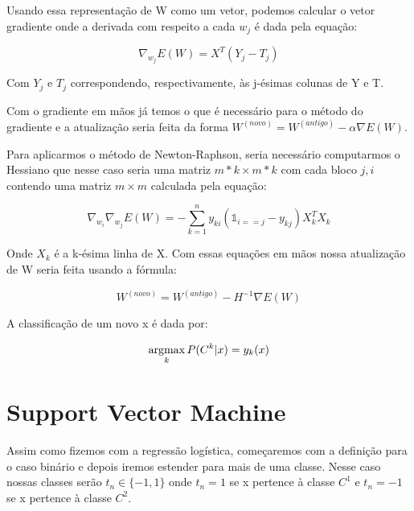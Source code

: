 Usando essa representação de W como um vetor, podemos calcular o vetor gradiente onde a derivada
com respeito a cada $w_j$ é dada pela equação:

\begin{center}
	\begin{equation}
		\nabla_{w_j} E(W) = X^T(Y_j - T_j)
	\end{equation}
\end{center}

Com $Y_j$ e $T_j$ correspondendo, respectivamente, às j-ésimas colunas de Y e T.

Com o gradiente em mãos já temos o que é necessário para o método do gradiente e a
atualização seria feita da forma $W^{ (novo) } = W^{ (antigo) } - \alpha \nabla E(W)$.

Para aplicarmos o método de Newton-Raphson, seria necessário computarmos o Hessiano que
nesse caso seria uma matriz $m*k \times m*k$ com cada bloco $j, i$ contendo uma matriz
$m \times m$ calculada pela equação:

\begin{center}
	\begin{equation}
		\nabla_{w_i} \nabla_{w_j} E(W) = - \sum_{k = 1}^n y_{ki}( \mathds{1}_{i == j} - y_{kj})
		X_k^TX_k
	\end{equation}
\end{center} 

Onde $X_k$ é a k-ésima linha de X. Com essas equações em mãos nossa atualização de
W seria feita usando a fórmula:

\begin{center}
	\begin{equation}
		 W^{ (novo) } = W^{ (antigo) } - H^{-1}\nabla E(W)	
	\end{equation}
\end{center}

A classificação de um novo x é dada por: 

\begin{center}
	\begin{equation}	
		\operatorname*{argmax}_{k} P(C^k | x) = y_k(x)
	\end{equation}
\end{center}


\section{Support Vector Machine}

Assim como fizemos com a regressão logística, começaremos com a definição
para o caso binário e depois iremos estender para mais de uma classe. Nesse caso
nossas classes serão $t_n \in \{-1, 1\}$ onde $t_n = 1$ se x pertence à classe $C^1$ e
$t_n = -1$ se x pertence à classe $C^2$.

